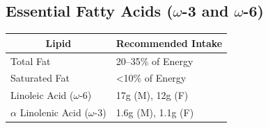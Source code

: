 \documentclass{tufte-handout}
\begin{document}
\subsection{Essential Fatty Acids ($\omega$-3  and $\omega$-6)}

\begin{margintable}
\centering
\caption{Recommended daily intake of lipids.  Based on the 2015--2020 USDA Dietary Guidelines \citep{USDA2015}.  Values are for an adult (19--30) year old.}\label{tab:lipid-amdr}
\begin{tabular}{ll}
\hline
\multicolumn{1}{c}{\textbf{Lipid}} & \textbf{Recommended Intake} \\ \hline
Total Fat &  20--35\% of Energy\\
Saturated Fat & <10\% of Energy\\
Linoleic Acid ($\omega$-6) & 17g (M), 12g (F) \\
$\alpha$ Linolenic Acid ($\omega$-3) & 1.6g (M), 1.1g (F) \\
\end{tabular}
\end{margintable}
\end{document}
